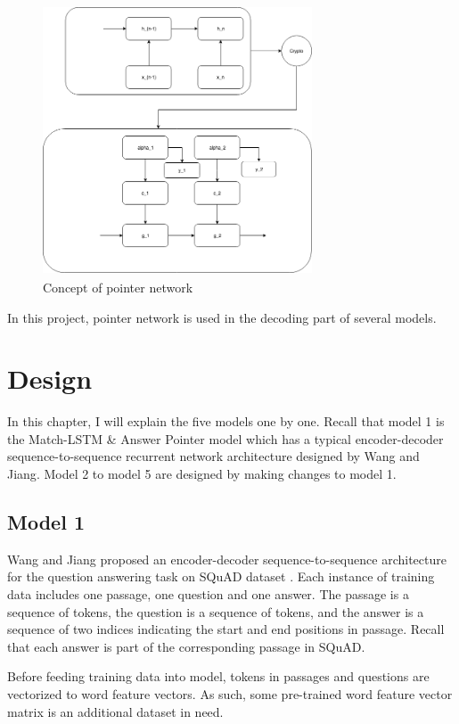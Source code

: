 \documentclass[modernstyle,12pt]{sjsuthesis}
\theoremstyle{definition}
\begin{document}
\begin{figure}[htbp]\centering
  \includegraphics[width=8cm, height=8cm]{figures/pointerNetwork.png}
  \caption{Concept of pointer network}
  \label{f:pointerNetwork}
\end{figure}

In this project, pointer network is used in the decoding part of several models.


\chapter{Design}\label{chap:design}

In this chapter, I will explain the five models one by one. Recall that model 1 is the Match-LSTM \& Answer Pointer model which has a typical encoder-decoder sequence-to-sequence recurrent network architecture designed by Wang and Jiang\cite{wang2016machine}. Model 2 to model 5 are designed by making changes to model 1.


\section{Model 1 }

Wang and Jiang  proposed an encoder-decoder sequence-to-sequence architecture for the question answering task on SQuAD dataset \cite{wang2016machine}. Each instance of training data includes one passage, one question and one answer. The passage is a sequence of tokens, the question is a sequence of tokens, and the answer is a sequence of two indices indicating the start and end positions in passage. Recall that each answer is part of the corresponding passage in SQuAD.

Before feeding training data into model, tokens in passages and questions are vectorized to word feature vectors. As such, some pre-trained word feature vector matrix is an additional dataset in need.
\end{document}
